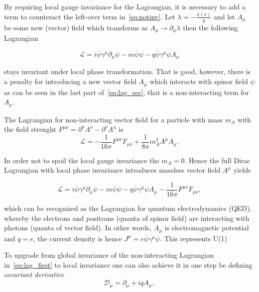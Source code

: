 By requiring local gauge invariance for the Lagrangian, it is necessary to add a term to counteract the left-over term in~\autoref{eq:notinv}. Let $\lambda=-\frac{\phi(x)}{q}$ and let $A_{\mu}$ be some new (vector) field which transforms as $A_{\mu} \rightarrow \partial_{\mu}\lambda$ then the following Lagrangian

\begin{equation}
	\mathcal{L} = i\overline{\psi}\gamma^{\mu}\partial_{\mu}\psi - m\overline{\psi}\psi - q\overline{\psi}\gamma^{\mu}\psi A_{\mu}
\label{eq:lag_sec}
\end{equation}

stays invariant under local phase transformation. That is good, however, there is a penalty for introducing a new vector field $A_{\mu}$ which interacts with spinor field $\psi$ as can be seen in the last part of~\autoref{eq:lag_sec}, that is a non-interacting term for $A_{\mu}$.

The Lagrangian for non-interacting vector field for a particle with mass $m_{A}$ with the field strenght $F^{\mu\nu}=\partial^{u}A^{\nu} - \partial^{\nu}A^{u}$ is
\begin{equation}
\mathcal{L}= -\frac{1}{16\pi} F^{\mu\nu}F_{\mu\nu} + \frac{1}{8\pi}m_{A}^{2}A^{\mu}A_{\mu}.
\end{equation}

In order not to spoil the local gauge invariance the $m_{A}=0$. Hence the full Dirac Lagrangian with local phase invariance introduces massless vector field $A^{\mu}$ yields

\begin{equation}
	\mathcal{L} = i\overline{\psi}\gamma^{\mu}\partial_{\mu}\psi - m\overline{\psi}\psi - q\overline{\psi}\gamma^{\mu}\psi A_{\mu} -\frac{1}{16\pi} F^{\mu\nu}F_{\mu\nu},
\label{eq:lag_thir}
\end{equation}

which can be recognized as the Lagrangian for quantum electrodynamics (QED), whereby the electrons and positrons (quanta of spinor field) are interacting with photons (quanta of vector field). In other words, $A_{\mu}$ is electromagnetic potential and $q=e$, the current density is hence $J^{\mu}=e\overline{\psi}\gamma^{\mu}\psi$. This represents U(1)  

To upgrade from global invariance of the non-interacting Lagrangian in~\autoref{eq:lag_first} to local invariance one can also achieve it in one step be defining \textit{covariant derivative}
\begin{equation}
	\mathcal{D}_{\mu} = \partial_{\mu}+ iqA_{\mu},
\end{equation}

